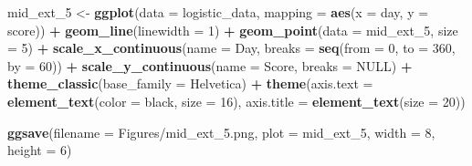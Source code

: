 \documentclass[
12pt, %
twoside,
english]{guelphthesis}
\newenvironment{Shaded}{\begin{snugshade}}{\end{snugshade}}
\newcommand{\AttributeTok}[1]{\textcolor[rgb]{0.13,0.29,0.53}{#1}}
\newcommand{\ConstantTok}[1]{\textcolor[rgb]{0.56,0.35,0.01}{#1}}
\newcommand{\DecValTok}[1]{\textcolor[rgb]{0.00,0.00,0.81}{#1}}
\newcommand{\FunctionTok}[1]{\textcolor[rgb]{0.13,0.29,0.53}{\textbf{#1}}}
\newcommand{\NormalTok}[1]{#1}
\newcommand{\OtherTok}[1]{\textcolor[rgb]{0.56,0.35,0.01}{#1}}
\newcommand{\SpecialCharTok}[1]{\textcolor[rgb]{0.81,0.36,0.00}{\textbf{#1}}}
\newcommand{\StringTok}[1]{\textcolor[rgb]{0.31,0.60,0.02}{#1}}
\begin{document}
\begin{Shaded}
\begin{Highlighting}[]
\NormalTok{mid\_ext\_5 }\OtherTok{\textless{}{-}} \FunctionTok{ggplot}\NormalTok{(}\AttributeTok{data =}\NormalTok{ logistic\_data, }\AttributeTok{mapping =} \FunctionTok{aes}\NormalTok{(}\AttributeTok{x =}\NormalTok{ day, }\AttributeTok{y =}\NormalTok{ score)) }\SpecialCharTok{+} 
  \FunctionTok{geom\_line}\NormalTok{(}\AttributeTok{linewidth =} \DecValTok{1}\NormalTok{) }\SpecialCharTok{+} 
  \FunctionTok{geom\_point}\NormalTok{(}\AttributeTok{data =}\NormalTok{ mid\_ext\_5, }\AttributeTok{size =} \DecValTok{5}\NormalTok{) }\SpecialCharTok{+} 
  \FunctionTok{scale\_x\_continuous}\NormalTok{(}\AttributeTok{name =} \StringTok{\textquotesingle{}Day\textquotesingle{}}\NormalTok{, }\AttributeTok{breaks =} \FunctionTok{seq}\NormalTok{(}\AttributeTok{from =} \DecValTok{0}\NormalTok{, }\AttributeTok{to =} \DecValTok{360}\NormalTok{, }\AttributeTok{by =} \DecValTok{60}\NormalTok{)) }\SpecialCharTok{+} 
  \FunctionTok{scale\_y\_continuous}\NormalTok{(}\AttributeTok{name =} \StringTok{\textquotesingle{}Score\textquotesingle{}}\NormalTok{, }\AttributeTok{breaks =} \ConstantTok{NULL}\NormalTok{) }\SpecialCharTok{+} 
  \FunctionTok{theme\_classic}\NormalTok{(}\AttributeTok{base\_family =} \StringTok{\textquotesingle{}Helvetica\textquotesingle{}}\NormalTok{) }\SpecialCharTok{+} 
  \FunctionTok{theme}\NormalTok{(}\AttributeTok{axis.text =} \FunctionTok{element\_text}\NormalTok{(}\AttributeTok{color =} \StringTok{\textquotesingle{}black\textquotesingle{}}\NormalTok{, }\AttributeTok{size =} \DecValTok{16}\NormalTok{), }
        \AttributeTok{axis.title =} \FunctionTok{element\_text}\NormalTok{(}\AttributeTok{size =} \DecValTok{20}\NormalTok{))}

\FunctionTok{ggsave}\NormalTok{(}\AttributeTok{filename =} \StringTok{\textquotesingle{}Figures/mid\_ext\_5.png\textquotesingle{}}\NormalTok{, }\AttributeTok{plot =}\NormalTok{ mid\_ext\_5, }\AttributeTok{width =} \DecValTok{8}\NormalTok{, }\AttributeTok{height =} \DecValTok{6}\NormalTok{)}
\end{Highlighting}
\end{Shaded}
\end{document}
